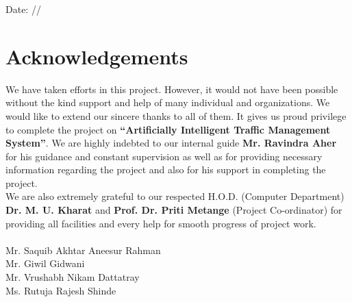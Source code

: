 \documentclass[openany,12pt]{report}
\begin{document}
	Date: \hspace{0.2 in}/\hspace{0.3 in}/   \\
	\newpage {}
	\chapter*{Acknowledgements}
	
	\hspace*{0.5 in}We have taken efforts in this project. However, it would not have been possible without the kind support and help of many individual and organizations. We would like to extend our sincere thanks to all of them. It gives us proud privilege to complete the project on \textbf{ ``Artificially Intelligent Traffic Management System''}. We are highly indebted to our internal guide \textbf{Mr. Ravindra Aher} for his guidance and constant supervision as well as for providing necessary information regarding the project and also for his support in completing the project.\\
	
	\hspace*{0.5 in}We are also extremely grateful to our respected H.O.D. (Computer Department) \textbf{Dr. M. U. Kharat} and \textbf{Prof. Dr. Priti Metange} (Project Co-ordinator) for providing all facilities and every help for smooth progress of project work.\\
	\\
	\hspace*{3.5 in}Mr. Saquib Akhtar Aneesur Rahman\\
	\hspace*{3.5 in}Mr. Giwil Gidwani \\
	\hspace*{3.5 in}Mr. Vrushabh Nikam Dattatray\\
	\hspace*{3.5 in}Ms. Rutuja Rajesh Shinde
	
\end{document}
